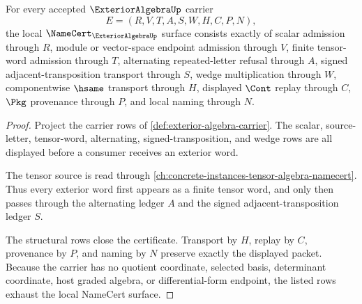 \begin{theorem}
\label{thm:exterior-algebra-namecert-obligations}
For every accepted $\ExteriorAlgebraUp$ carrier
$$
E=(R,V,T,A,S,W,H,C,P,N),
$$
the local $\NameCert_{\ExteriorAlgebraUp}$ surface consists exactly of scalar admission through $R$, module or vector-space endpoint admission through $V$, finite tensor-word admission through $T$, alternating repeated-letter refusal through $A$, signed adjacent-transposition transport through $S$, wedge multiplication through $W$, componentwise $\hsame$ transport through $H$, displayed $\Cont$ replay through $C$, $\Pkg$ provenance through $P$, and local naming through $N$.
\end{theorem}
\begin{proof}
Project the carrier rows of \autoref{def:exterior-algebra-carrier}. The scalar, source-letter, tensor-word, alternating, signed-transposition, and wedge rows are all displayed before a consumer receives an exterior word.

The tensor source is read through \autoref{ch:concrete-instances-tensor-algebra-namecert}. Thus every exterior word first appears as a finite tensor word, and only then passes through the alternating ledger $A$ and the signed adjacent-transposition ledger $S$.

The structural rows close the certificate. Transport by $H$, replay by $C$, provenance by $P$, and naming by $N$ preserve exactly the displayed packet. Because the carrier has no quotient coordinate, selected basis, determinant coordinate, host graded algebra, or differential-form endpoint, the listed rows exhaust the local NameCert surface.
\end{proof}

